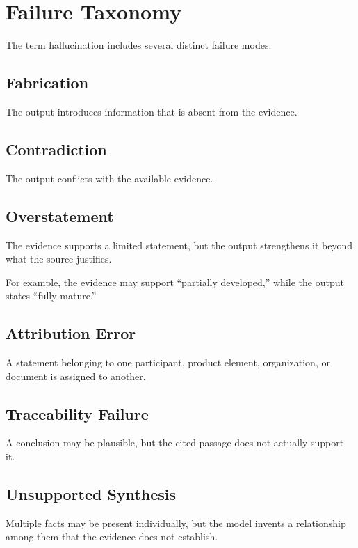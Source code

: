 \documentclass[11pt]{report}
\begin{document}
\section{Failure Taxonomy}

The term hallucination includes several distinct failure modes.

\subsection{Fabrication}

The output introduces information that is absent from the evidence.

\subsection{Contradiction}

The output conflicts with the available evidence.

\subsection{Overstatement}

The evidence supports a limited statement, but the output strengthens it beyond what the source justifies.

For example, the evidence may support ``partially developed,'' while the output states ``fully mature.''

\subsection{Attribution Error}

A statement belonging to one participant, product element, organization, or document is assigned to another.

\subsection{Traceability Failure}

A conclusion may be plausible, but the cited passage does not actually support it.

\subsection{Unsupported Synthesis}

Multiple facts may be present individually, but the model invents a relationship among them that the evidence does not establish.
\end{document}

